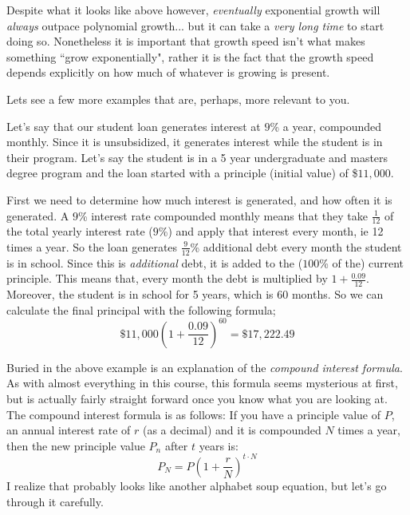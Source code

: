 \documentclass{ximeraXloud}
\begin{document}
    Despite what it looks like above however, \textit{eventually} exponential growth will \textit{always} outpace polynomial growth... but it can take a \textit{very long time} to start doing so. Nonetheless it is important that growth speed isn't what makes something ``grow exponentially", rather it is the fact that the growth speed depends explicitly on how much of whatever is growing is present.
    
    Lets see a few more examples that are, perhaps, more relevant to you.
    
    \begin{explanation}%
        Let's say that our student loan generates interest at $9$\% a year, compounded monthly. Since it is unsubsidized, it generates interest while the student is in their program. Let's say the student is in a 5 year undergraduate and masters degree program and the loan started with a principle (initial value) of \$$11,000$.
        
        First we need to determine how much interest is generated, and how often it is generated. A $9$\% interest rate compounded monthly means that they take $\frac{1}{12}$ of the total yearly interest rate ($9$\%) and apply that interest every month, ie 12 times a year. So the loan generates $\frac{9}{12}$\% additional debt every month the student is in school. Since this is \textit{additional} debt, it is added to the ($100$\% of the) current principle. This means that, every month the debt is multiplied by $1 + \frac{0.09}{12}$. Moreover, the student is in school for 5 years, which is 60 months. So we can calculate the final principal with the following formula;
        \[
            \$11,000\left(1 + \frac{0.09}{12}\right)^{60} = \$17,222.49
        \]
    \end{explanation}%
        
    Buried in the above example is an explanation of the \textit{compound interest formula}. As with almost everything in this course, this formula seems mysterious at first, but is actually fairly straight forward once you know what you are looking at. The compound interest formula is as follows: If you have a principle value of $P$, an annual interest rate of $r$ (as a decimal) and it is compounded $N$ times a year, then the new principle value $P_n$ after $t$ years is:
    \[
        P_N = P\left(1 + \frac{r}{N}\right)^{t\cdot N}
    \]
    I realize that probably looks like another alphabet soup equation, but let's go through it carefully.
    
\end{document}
